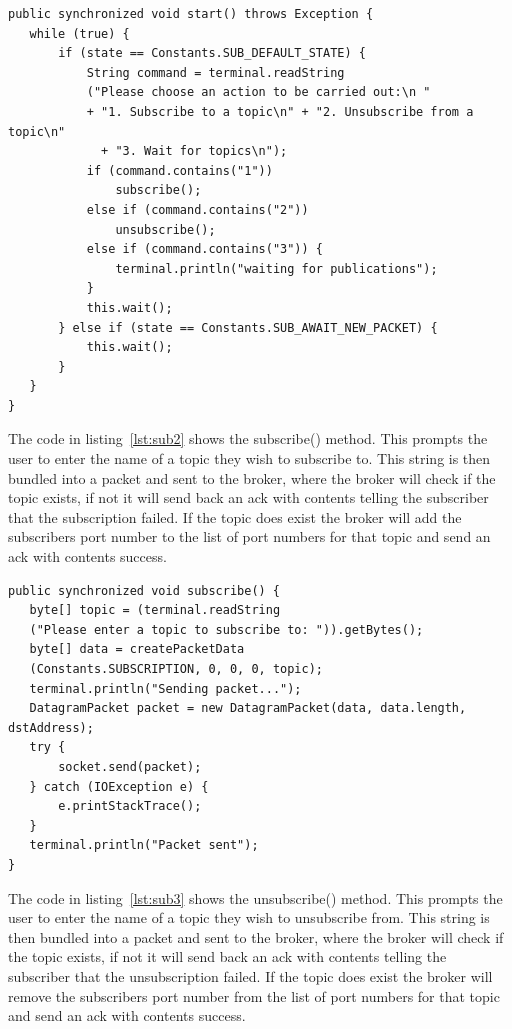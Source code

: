 \documentclass{article}
\begin{document}
\begin{lstlisting}[caption={[Sample Code 2]start() method, handles user interaction}, label={lst:sub1}]
public synchronized void start() throws Exception {
   while (true) {
	   if (state == Constants.SUB_DEFAULT_STATE) {
		   String command = terminal.readString
	       ("Please choose an action to be carried out:\n "
	       + "1. Subscribe to a topic\n" + "2. Unsubscribe from a topic\n"
			 + "3. Wait for topics\n");
		   if (command.contains("1"))
			   subscribe();
		   else if (command.contains("2"))
			   unsubscribe();
		   else if (command.contains("3")) {
			   terminal.println("waiting for publications");
		   }
		   this.wait();
	   } else if (state == Constants.SUB_AWAIT_NEW_PACKET) {
		   this.wait();
	   }
   }
}
\end{lstlisting}

The code in listing~\ref{lst:sub2} shows the subscribe() method. This prompts the user to enter the name of a topic they wish to subscribe to. This string is then bundled into a packet and sent to the broker, where the broker will check if the topic exists, if not it will send back an ack with contents telling the subscriber that the subscription failed. If the topic does exist the broker will add the subscribers port number to the list of port numbers for that topic and send an ack with contents success.

\begin{lstlisting}[caption={[Sample Code 2]subscribe() method, takes input from the user and sends a subscribe packet to the broker}, label={lst:sub2}]
public synchronized void subscribe() {
   byte[] topic = (terminal.readString
   ("Please enter a topic to subscribe to: ")).getBytes();
   byte[] data = createPacketData
   (Constants.SUBSCRIPTION, 0, 0, 0, topic);
   terminal.println("Sending packet...");
   DatagramPacket packet = new DatagramPacket(data, data.length, dstAddress);
   try {
	   socket.send(packet);
   } catch (IOException e) {
	   e.printStackTrace();
   }
   terminal.println("Packet sent");
}
\end{lstlisting}

The code in listing~\ref{lst:sub3} shows the unsubscribe() method. This prompts the user to enter the name of a topic they wish to unsubscribe from. This string is then bundled into a packet and sent to the broker, where the broker will check if the topic exists, if not it will send back an ack with contents telling the subscriber that the unsubscription failed. If the topic does exist the broker will remove the subscribers port number from the list of port numbers for that topic and send an ack with contents success.
\end{document}
